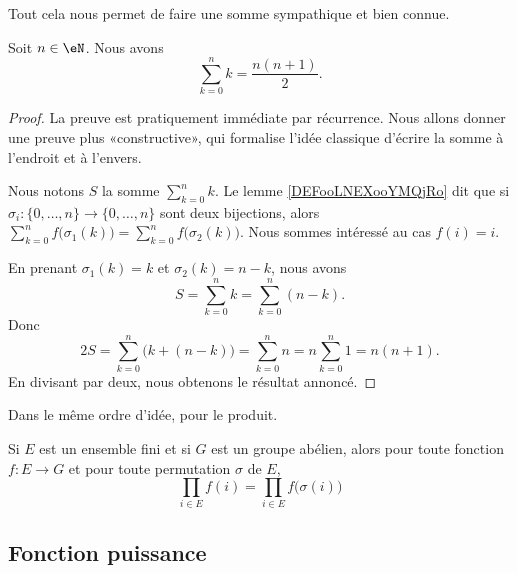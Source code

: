 Tout cela nous permet de faire une somme sympathique et bien connue.
\begin{lemma}
    Soit \( n\in \eN\). Nous avons
    \begin{equation}
        \sum_{k=0}^nk=\frac{ n(n+1) }{ 2 }.
    \end{equation}
\end{lemma}

\begin{proof}
    La preuve est pratiquement immédiate par récurrence. Nous allons donner une preuve plus «constructive», qui formalise l'idée classique d'écrire la somme à l'endroit et à l'envers.


    Nous notons \( S\) la somme \( \sum_{k=0}^nk\). Le lemme \ref{DEFooLNEXooYMQjRo} dit que si \( \sigma_i\colon \{ 0,\ldots, n \}\to \{ 0,\ldots, n \}\) sont deux bijections, alors \( \sum_{k=0}^nf\big( \sigma_1(k) \big)=\sum_{k=0}^nf\big( \sigma_2(k) \big)\). Nous sommes intéressé au cas \( f(i)=i\).

    En prenant \( \sigma_1(k)=k\) et \( \sigma_2(k)=n-k\), nous avons
    \begin{equation}
        S=\sum_{k=0}^nk=\sum_{k=0}^n(n-k).
    \end{equation}
    Donc
    \begin{equation}
        2S=\sum_{k=0}^n\big( k+(n-k) \big)=\sum_{k=0}^nn=n\sum_{k=0}^n1=n(n+1).
    \end{equation}
    En divisant par deux, nous obtenons le résultat annoncé.
\end{proof}

Dans le même ordre d'idée, pour le produit.
\begin{proposition}     \label{PROPooQMUDooQQVRIe}
    Si \( E\) est un ensemble fini et si \( G\) est un groupe abélien, alors pour toute fonction \( f\colon E\to G\) et pour toute permutation \( \sigma\) de \( E\),
    \begin{equation}
        \prod_{i\in E}f(i)=\prod_{i\in E}f\big( \sigma(i) \big)
    \end{equation}
\end{proposition}

\subsection{Fonction puissance}

